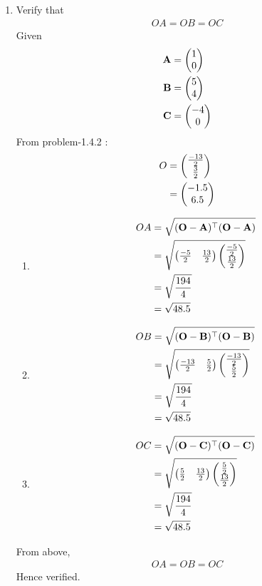 \documentclass[11pt]{book}
\begin{document}
\begin{enumerate}[label=\thesection.\arabic*.,ref=\thesection.\theenumi]
\item Verify that 
\begin{align}
OA = OB = OC 
\end{align} 
\solution
Given \begin{align}
\mathbf{A} &= \begin{pmatrix}1\\0\end{pmatrix}\\
\mathbf{B} &= \begin{pmatrix}5\\4\end{pmatrix}\\
\mathbf{C} &= \begin{pmatrix}-4\\0\end{pmatrix}
\end{align}
From problem-1.4.2 :
\begin{align}
O &= \begin{pmatrix}\frac{-13}{2} \\ \frac{3}{2}\end{pmatrix}\\
 &= \begin{pmatrix}-1.5\\ 6.5\end{pmatrix}
\end{align}
\begin{enumerate}
\item 
\begin{align}
OA &= \sqrt{(\mathbf{O}-\mathbf{A})^{\top}(\mathbf{O}-\mathbf{A})}\\
&= \sqrt{\begin{pmatrix}\frac{-5}{2} & \frac{13}{2}\end{pmatrix} \begin{pmatrix}\frac{-5}{2} \\ \frac{13}{2}\end{pmatrix}}\\
 &= \sqrt{\frac{194}{4}}\\
 &= \sqrt{48.5}
\end{align}
\item 
\begin{align}
OB &= \sqrt{(\mathbf{O}-\mathbf{B})^{\top}(\mathbf{O}-\mathbf{B})}\\
&= \sqrt{\begin{pmatrix}\frac{-13}{2} & \frac{5}{2}\end{pmatrix} \begin{pmatrix}\frac{-13}{2} \\ \frac{5}{2}\end{pmatrix}}\\
 &= \sqrt{\frac{194}{4}}\\
 &= \sqrt{48.5}
\end{align}
\item 
\begin{align}
OC &= \sqrt{(\mathbf{O}-\mathbf{C})^{\top}(\mathbf{O}-\mathbf{C})}\\
&= \sqrt{\begin{pmatrix}\frac{5}{2} & \frac{13}{2}\end{pmatrix} \begin{pmatrix}\frac{5}{2} \\ \frac{13}{2}\end{pmatrix}}\\
 &= \sqrt{\frac{194}{4}}\\
 &= \sqrt{48.5}
\end{align}
\end{enumerate}
From above, 
\begin{align}
OA = OB = OC
\end{align}
Hence verified.


\end{enumerate}
\end{document}
